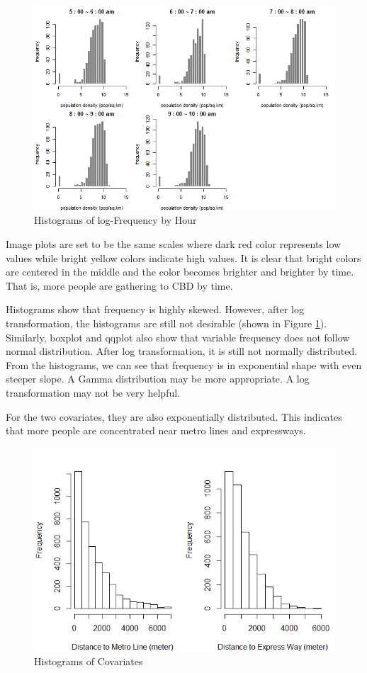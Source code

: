 \documentclass[hidelinks,12pt]{article}
\begin{document}
	\begin{figure}[!ht]
		\includegraphics[width=\textwidth]{hist_log.png}
		\caption{Histograms of log-Frequency by Hour \label{fig:lghist}}
	\end{figure}

	Image plots are set to be the same scales where dark red color represents low values while bright yellow colors indicate high values. It is clear that bright colors are centered in the middle and the color becomes brighter and brighter by time. That is, more people are gathering to CBD by time.
	
	Histograms show that frequency is highly skewed. However, after log transformation, the histograms are still not desirable (shown in Figure \ref{fig:lghist}). Similarly, boxplot and qqplot also show that variable frequency does not follow normal distribution. After log transformation, it is still not normally distributed. From the histograms, we can see that frequency is in exponential shape with even steeper slope. A Gamma distribution may be more appropriate. A log transformation may not be very helpful.
	
	For the two covariates, they are also exponentially distributed. This indicates that more people are concentrated near metro lines and expressways.
	\begin{figure}[!ht]
		\includegraphics[width=\textwidth]{hist_x.png}
		\caption{Histograms of Covariates \label{fig:histx}}
	\end{figure}
\end{document}
